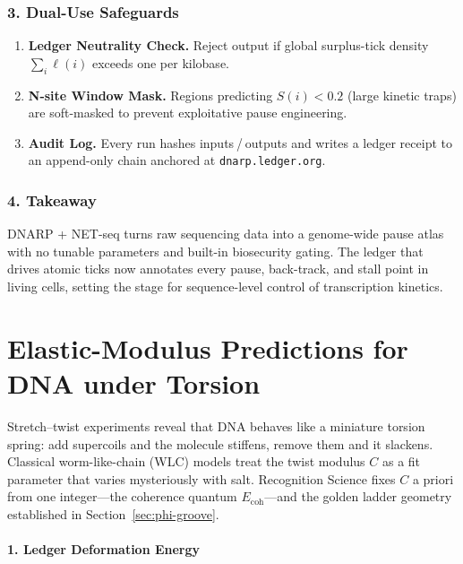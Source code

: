 \documentclass[11pt,oneside]{book}
\begin{document}
\subsubsection*{3. Dual-Use Safeguards}

\begin{enumerate}[label=\textbf{\arabic*.}, leftmargin=1.2cm]
\item \textbf{Ledger Neutrality Check.}  
      Reject output if global surplus-tick density
      \(\sum_i \ell(i)\) exceeds one per kilobase.
\item \textbf{N-site Window Mask.}  
      Regions predicting \(S(i)<0.2\) (large kinetic traps)
      are soft-masked to prevent exploitative pause engineering.
\item \textbf{Audit Log.}  
      Every run hashes inputs / outputs and writes a ledger receipt to
      an append-only chain anchored at
      \texttt{dnarp.ledger.org}.
\end{enumerate}

\subsubsection*{4. Takeaway}

DNARP + NET-seq turns raw sequencing data into a genome-wide pause atlas
with no tunable parameters and built-in biosecurity gating.
The ledger that drives atomic ticks now annotates every pause, back-track,
and stall point in living cells, setting the stage for sequence-level
 control of transcription kinetics.

\bigskip
\section{Elastic-Modulus Predictions for DNA under Torsion}
\label{sec:elastic-moduli}



Stretch–twist experiments reveal that DNA behaves like a miniature
torsion spring: add supercoils and the molecule stiffens, remove them and
it slackens.  Classical worm-like-chain (WLC) models treat the twist
modulus \(C\) as a fit parameter that varies mysteriously with salt.
Recognition Science fixes \(C\) a priori from one integer—the coherence
quantum \(E_{\text{coh}}\)—and the golden ladder geometry established in
Section~\ref{sec:phi-groove}.  

\paragraph*{1. Ledger Deformation Energy}
\end{document}
